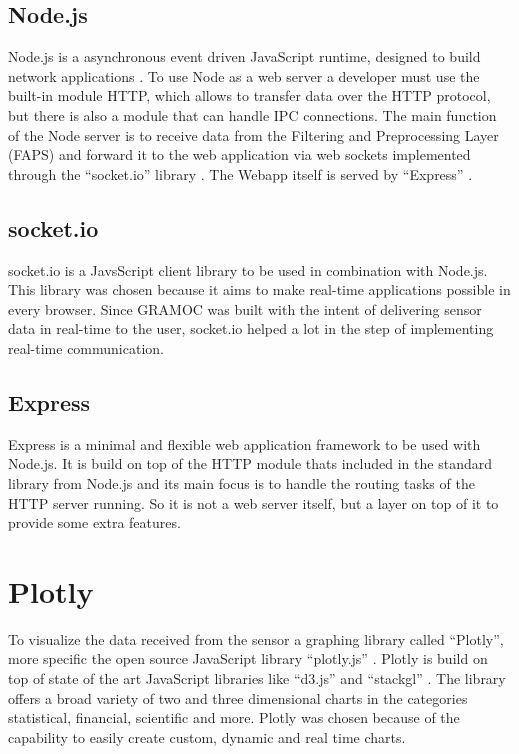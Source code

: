 \subsection{Node.js}
Node.js is a asynchronous event driven JavaScript runtime, designed to build network applications \cite{Node}. To use Node as a web server a developer must use the built-in module HTTP, which allows to transfer data over the HTTP protocol, but there is also a module that can handle IPC connections. The main function of the Node server is to receive data from the Filtering and Preprocessing Layer (FAPS) and forward it to the web application via web sockets implemented through the ``socket.io'' library \cite{socketio}. The Webapp itself is served by ``Express'' \cite{express}.

\subsection{socket.io}
socket.io is a JavsScript client library to be used in combination with Node.js. This library was chosen because it aims to make real-time applications possible in every browser. Since GRAMOC was built with the intent of delivering sensor data in real-time to the user, socket.io helped a lot in the step of implementing real-time communication.

\subsection{Express}
Express is a minimal and flexible web application framework to be used with Node.js. It is build on top of the HTTP module thats included in the standard library from Node.js and its main focus is to handle the routing tasks of the HTTP server running. So it is not a web server itself, but a layer on top of it to provide some extra features.

\section{Plotly}
To visualize the data received from the sensor a graphing library called ``Plotly'', more specific the open source JavaScript library ``plotly.js'' \cite{Plotly} \cite{PlotlyJS}. Plotly is build on top of state of the art JavaScript libraries like ``d3.js''  and ``stackgl'' \cite{d3} \cite{stackgl}. The library offers a broad variety of two and three dimensional charts in the categories statistical, financial, scientific and more. Plotly was chosen because of the capability to easily create custom, dynamic and real time charts.


